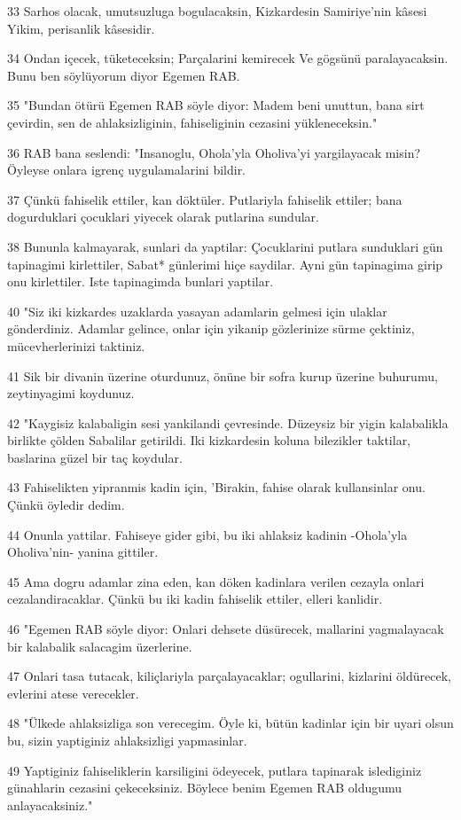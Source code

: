 \par 33 Sarhos olacak, umutsuzluga bogulacaksin, Kizkardesin Samiriye'nin kâsesi Yikim, perisanlik kâsesidir.
\par 34 Ondan içecek, tüketeceksin; Parçalarini kemirecek Ve gögsünü paralayacaksin. Bunu ben söylüyorum diyor Egemen RAB.
\par 35 "Bundan ötürü Egemen RAB söyle diyor: Madem beni unuttun, bana sirt çevirdin, sen de ahlaksizliginin, fahiseliginin cezasini yükleneceksin."
\par 36 RAB bana seslendi: "Insanoglu, Ohola'yla Oholiva'yi yargilayacak misin? Öyleyse onlara igrenç uygulamalarini bildir.
\par 37 Çünkü fahiselik ettiler, kan döktüler. Putlariyla fahiselik ettiler; bana dogurduklari çocuklari yiyecek olarak putlarina sundular.
\par 38 Bununla kalmayarak, sunlari da yaptilar: Çocuklarini putlara sunduklari gün tapinagimi kirlettiler, Sabat* günlerimi hiçe saydilar. Ayni gün tapinagima girip onu kirlettiler. Iste tapinagimda bunlari yaptilar.
\par 40 "Siz iki kizkardes uzaklarda yasayan adamlarin gelmesi için ulaklar gönderdiniz. Adamlar gelince, onlar için yikanip gözlerinize sürme çektiniz, mücevherlerinizi taktiniz.
\par 41 Sik bir divanin üzerine oturdunuz, önüne bir sofra kurup üzerine buhurumu, zeytinyagimi koydunuz.
\par 42 "Kaygisiz kalabaligin sesi yankilandi çevresinde. Düzeysiz bir yigin kalabalikla birlikte çölden Sabalilar getirildi. Iki kizkardesin koluna bilezikler taktilar, baslarina güzel bir taç koydular.
\par 43 Fahiselikten yipranmis kadin için, 'Birakin, fahise olarak kullansinlar onu. Çünkü öyledir dedim.
\par 44 Onunla yattilar. Fahiseye gider gibi, bu iki ahlaksiz kadinin -Ohola'yla Oholiva'nin- yanina gittiler.
\par 45 Ama dogru adamlar zina eden, kan döken kadinlara verilen cezayla onlari cezalandiracaklar. Çünkü bu iki kadin fahiselik ettiler, elleri kanlidir.
\par 46 "Egemen RAB söyle diyor: Onlari dehsete düsürecek, mallarini yagmalayacak bir kalabalik salacagim üzerlerine.
\par 47 Onlari tasa tutacak, kiliçlariyla parçalayacaklar; ogullarini, kizlarini öldürecek, evlerini atese verecekler.
\par 48 "Ülkede ahlaksizliga son verecegim. Öyle ki, bütün kadinlar için bir uyari olsun bu, sizin yaptiginiz ahlaksizligi yapmasinlar.
\par 49 Yaptiginiz fahiseliklerin karsiligini ödeyecek, putlara tapinarak islediginiz günahlarin cezasini çekeceksiniz. Böylece benim Egemen RAB oldugumu anlayacaksiniz."


